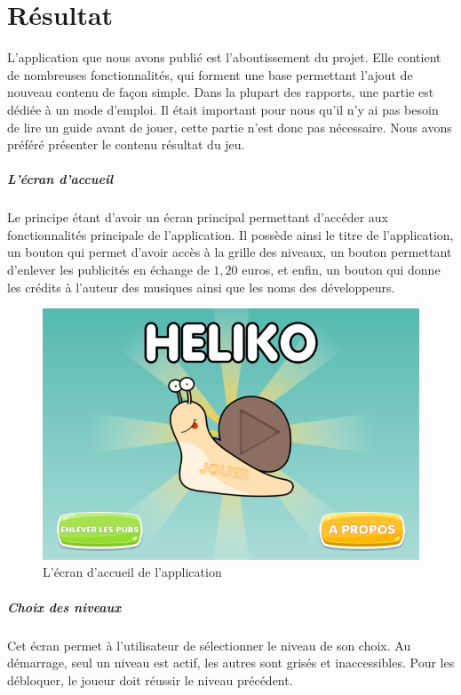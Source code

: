 \chapter{Résultat}

L'application que nous avons publié est l'aboutissement du projet. Elle contient de nombreuses fonctionnalités, qui forment une base permettant l'ajout de nouveau contenu de façon simple. Dans la plupart des rapports, une partie est dédiée à un mode d'emploi. Il était important pour nous qu'il n'y ai pas besoin de lire un guide avant de jouer, cette partie n'est donc pas nécessaire. Nous avons préféré présenter le contenu résultat du jeu.

\paragraph{L'écran d'accueil} Le principe étant d'avoir un écran principal permettant d'accéder aux fonctionnalités principale de l'application. Il possède ainsi le titre de l'application, un bouton qui permet d'avoir accès à la grille des niveaux, un bouton permettant d'enlever les publicités en échange de $1,20$ euros, et enfin, un bouton qui donne les crédits à l'auteur des musiques ainsi que les noms des développeurs.

\begin{figure}[H]\centering
  \includegraphics[scale=0.6]{./img/resultat_accueil.png}
  \caption{L'écran d'accueil de l'application}
  \label{accueil_appli}
\end{figure}

\paragraph{Choix des niveaux} Cet écran permet à l'utilisateur de sélectionner le niveau de son choix. Au démarrage, seul un niveau est actif, les autres sont grisés et inaccessibles. Pour les débloquer, le joueur doit réussir le niveau précédent.

